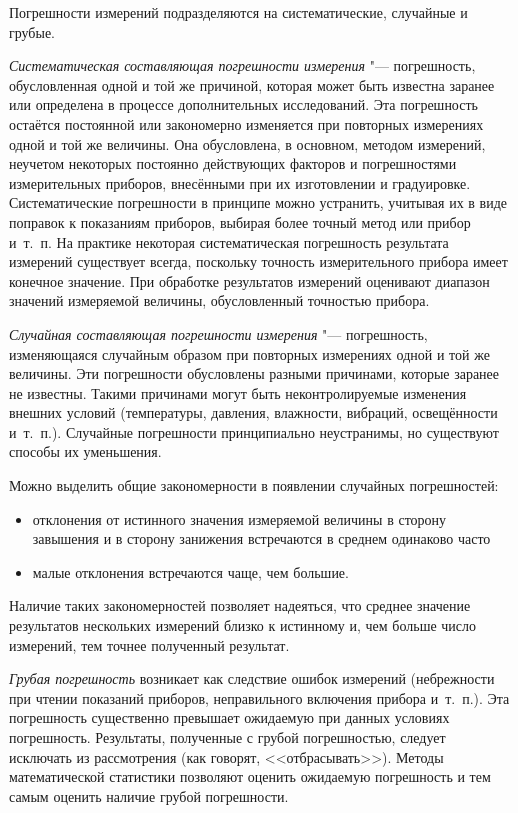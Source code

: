 \documentclass[a4paper, 12pt]{extarticle}
\begin{document}
Погрешности измерений подразделяются на систематические, случайные и грубые.

\emph{Систематическая составляющая погрешности измерения} "--- погрешность, обусловленная одной и той же причиной, которая может быть известна заранее или определена в процессе дополнительных исследований. Эта погрешность остаётся постоянной или закономерно изменяется при повторных измерениях одной и той же величины. Она обусловлена, в основном, методом измерений, неучетом некоторых постоянно действующих факторов и погрешностями измерительных приборов, внесёнными при их изготовлении и градуировке. Систематические погрешности в принципе можно устранить, учитывая их в виде поправок к показаниям приборов, выбирая более точный метод или прибор и~т.~п. На практике некоторая систематическая погрешность результата измерений существует всегда, поскольку точность измерительного прибора имеет конечное значение. При обработке результатов измерений оценивают диапазон значений измеряемой величины, обусловленный точностью прибора.

\emph{Случайная составляющая погрешности измерения} "---  погрешность, изменяющаяся случайным образом при повторных измерениях одной и той же величины. Эти погрешности обусловлены разными причинами, которые заранее не известны. Такими причинами могут быть неконтролируемые изменения внешних условий (температуры, давления, влажности, вибраций, освещённости и~т.~п.). Случайные погрешности принципиально неустранимы, но существуют способы их уменьшения.

Можно выделить общие закономерности в появлении случайных погрешностей:
\begin{itemize}
  \item отклонения от истинного значения измеряемой величины в
сторону завышения и в сторону занижения встречаются в среднем
одинаково часто
  \item малые отклонения встречаются чаще, чем большие.
\end{itemize}

Наличие таких закономерностей позволяет надеяться, что среднее значение результатов нескольких измерений близко к истинному и, чем больше число измерений, тем точнее полученный результат.

\emph{Грубая погрешность} возникает как следствие ошибок измерений (небрежности при чтении показаний приборов, неправильного включения прибора и~т.~п.). Эта погрешность существенно превышает ожидаемую при данных условиях погрешность. Результаты, полученные с грубой погрешностью, следует исключать из рассмотрения (как говорят, <<отбрасывать>>). Методы математической статистики позволяют оценить ожидаемую погрешность и тем самым оценить наличие грубой погрешности.
\end{document}
